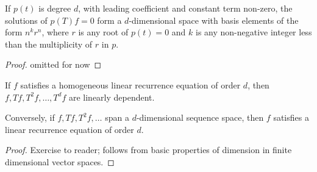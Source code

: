 \begin{theorem}
If $p(t)$ is degree $d$, with leading coefficient and constant term non-zero, the solutions of $p(T)f = 0$ form a $d$-dimensional space with basis elements of the form $n^kr^n$, where $r$ is any root of $p(t) = 0$ and $k$ is any non-negative integer less than the multiplicity of $r$ in $p$.
\end{theorem}

\begin{proof}
omitted for now
\end{proof}

\begin{theorem}
If $f$ satisfies a homogeneous linear recurrence equation of order $d$, then $f, Tf, T^2f, \dots, T^df$ are linearly dependent.

Conversely, if $f, Tf, T^2f, \dots$ span a $d$-dimensional sequence space, then $f$ satisfies a linear recurrence equation of order $d$.
\end{theorem}
\begin{proof}
Exercise to reader; follows from basic properties of dimension in finite dimensional vector spaces.
\end{proof}